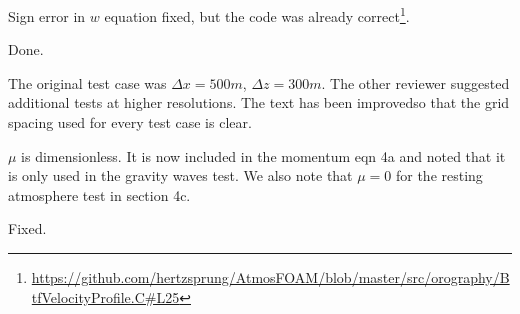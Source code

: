 \documentclass{article}
\begin{document}
\begin{quotation}
\begin{comment}
\item Eq. (16): see comment 19 concerning the different sign conventions and unify the presentation.  In addition, the formulation for $w$ is wrong and has a sign error.  The vertical velocity $w$ needs to be multiplied with ($-1$) to correct it in its current form.  In case you used the wrong formulation for the results, they all need to be rerun.
\end{comment}
\end{quotation}
Sign error in $w$ equation fixed, but the code was already correct\footnote{\url{https://github.com/hertzsprung/AtmosFOAM/blob/master/src/orography/BtfVelocityProfile.C#L25}}.

\begin{quotation}
\begin{comment}
\item Line 281: `\ldots Courant number \ldots'
\end{comment}
\end{quotation}
Done.

\begin{quotation}
\begin{comment}
\item Section 3d: what is the grid spacing for this test case?
\end{comment}
\end{quotation}
The original test case was $\Delta x = 500m$, $\Delta z = 300m$.  The other reviewer suggested additional tests at higher resolutions.  The text has been improvedso that the grid spacing used for every test case is clear.

\begin{quotation}
\begin{comment}
\item Line 344: The physical unit of $\mu$ is missing.
\end{comment}
\end{quotation}
$\mu$ is dimensionless.  It is now included in the momentum eqn 4a and noted that it is only used in the gravity waves test.  We also note that $\mu = 0$ for the resting atmosphere test in section 4c.

\begin{quotation}
\begin{comment}
\item Line 414: `\ldots Charney--Phillips \ldots'
\end{comment}
\end{quotation}
Fixed.
\end{document}
